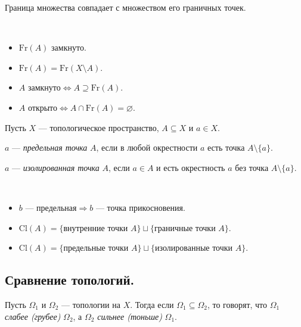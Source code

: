 \documentclass[12pt,a4paper]{article}
\newcommand{\Cl}{\ensuremath{\mathrm{Cl}}\xspace}
\newcommand{\Fr}{\ensuremath{\mathrm{Fr}}\xspace}
\begin{document}
    \begin{theorem}
        Граница множества совпадает с множеством его граничных точек.
    \end{theorem}

    \begin{theorem}\ 
        \begin{multicols}{2}
            \begin{itemize}
                \item $\Fr(A)$ замкнуто.
                \item $\Fr(A) = \Fr(X \setminus A)$.
                \item $A\text{ замкнуто} \Leftrightarrow A \supseteq \Fr(A)$.
                \item $A\text{ открыто} \Leftrightarrow A \cap \Fr(A) = \varnothing$.
            \end{itemize}
        \end{multicols}
    \end{theorem}

    \begin{definition}
        Пусть $X$ --- топологическое пространство, $A \subseteq X$ и $a \in X$.

        $a$ --- \emph{предельная точка} $A$, если в любой окрестности $a$ есть точка $A \setminus \{a\}$.

        $a$ --- \emph{изолированная точка} $A$, если $a \in A$ и есть окрестность $a$ без точка $A \setminus \{a\}$.
    \end{definition}

    \begin{theorem}\ 
        \begin{itemize}
            \item $b\text{ --- предельная} \Rightarrow b\text{ --- точка прикосновения}$.
            \item $\Cl(A) = \{\text{внутренние точки $A$}\} \sqcup \{\text{граничные точки $A$}\}$.
            \item $\Cl(A) = \{\text{предельные точки $A$}\} \sqcup \{\text{изолированные точки $A$}\}$.
        \end{itemize}
    \end{theorem}

    \subsection{Сравнение топологий.}

    \begin{definition}
        Пусть $\Omega_1$ и $\Omega_2$ --- топологии на $X$. Тогда если $\Omega_1 \subseteq \Omega_2$, то говорят, что $\Omega_1$ \emph{слабее (грубее)} $\Omega_2$, а $\Omega_2$ \emph{сильнее (тоньше)} $\Omega_1$.
    \end{definition}
\end{document}
